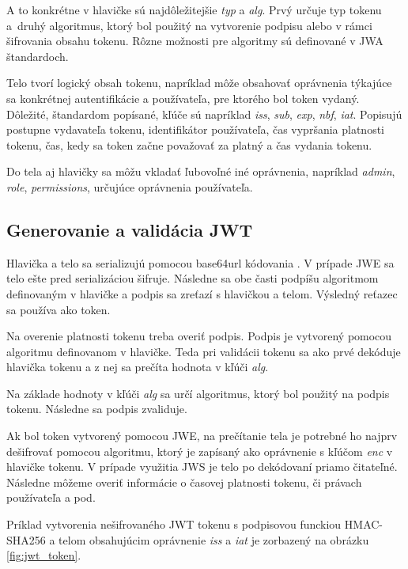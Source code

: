 A to konkrétne v hlavičke sú najdôležitejšie \textit{typ} a \textit{alg}. Prvý určuje typ tokenu a~druhý algoritmus, ktorý bol použitý na vytvorenie podpisu alebo v rámci šifrovania obsahu tokenu. Rôzne možnosti pre algoritmy sú definované v JWA štandardoch.

Telo tvorí logický obsah tokenu, napríklad môže obsahovať oprávnenia týkajúce sa konkrétnej autentifikácie a používateľa, pre ktorého bol token vydaný. Dôležité, štandardom popísané, kľúče sú napríklad \textit{iss}, \textit{sub}, \textit{exp}, \textit{nbf}, \textit{iat}. Popisujú postupne vydavateľa tokenu, identifikátor používateľa, čas vypršania platnosti tokenu, čas, kedy sa token začne považovať za platný a čas vydania tokenu.

Do tela aj hlavičky sa môžu vkladať ľubovoľné iné oprávnenia, napríklad \textit{admin}, \textit{role}, \textit{permissions}, určujúce oprávnenia používateľa.

\subsection{Generovanie a validácia JWT}

Hlavička a telo sa serializujú pomocou base64url kódovania \cite{base64_rfc}. V prípade JWE sa telo ešte pred serializáciou šifruje. Následne sa obe časti podpíšu algoritmom definovaným v hlavičke a podpis sa zreťazí s hlavičkou a telom. Výsledný reťazec sa používa ako token.

Na overenie platnosti tokenu treba overiť podpis. Podpis je vytvorený pomocou algoritmu definovanom v hlavičke. Teda pri validácii tokenu sa ako prvé dekóduje hlavička tokenu a z nej sa prečíta hodnota v kľúči \textit{alg}.

Na základe hodnoty v kľúči \textit{alg} sa určí algoritmus, ktorý bol použitý na podpis tokenu. Následne sa podpis zvaliduje. 

Ak bol token vytvorený pomocou JWE, na prečítanie tela je potrebné ho najprv dešifrovať pomocou algoritmu, ktorý je zapísaný ako oprávnenie s kľúčom \textit{enc} v hlavičke tokenu. V prípade využitia JWS je telo po dekódovaní priamo čitateľné. Následne môžeme overiť informácie o časovej platnosti tokenu, či právach používateľa a pod.

Príklad vytvorenia nešifrovaného JWT tokenu s podpisovou funckiou HMAC-SHA256 a telom obsahujúcim oprávnenie \textit{iss} a \textit{iat} je zorbazený na obrázku \ref{fig:jwt_token}.

